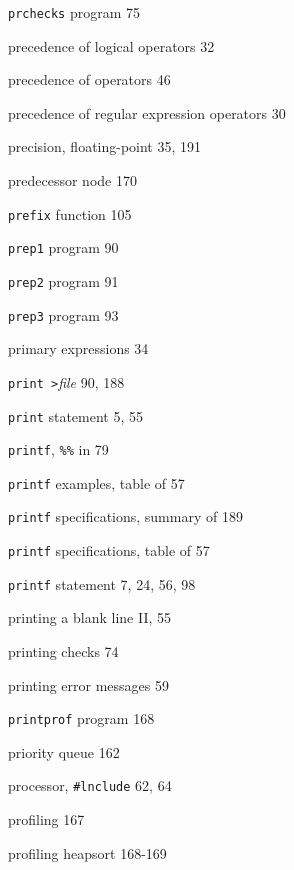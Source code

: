 \begin{multicols}{3}
\hangindent=3pc  \verb'prchecks' program 75

\hangindent=3pc  precedence of logical operators 32

\hangindent=3pc  precedence of operators 46

\hangindent=3pc  precedence of regular expression operators 30

\hangindent=3pc  precision, floating-point 35, 191

\hangindent=3pc  predecessor node 170

\hangindent=3pc  \verb'prefix' function 105

\hangindent=3pc  \verb'prep1' program 90

\hangindent=3pc  \verb'prep2' program 91

\hangindent=3pc  \verb'prep3' program 93

\hangindent=3pc  primary expressions 34

\hangindent=3pc  \verb'print >'\textit{file} 90, 188

\hangindent=3pc  \verb'print' statement 5, 55

\hangindent=3pc  \verb'printf', \verb'%%' in 79

\hangindent=3pc  \verb'printf' examples, table of 57

\hangindent=3pc  \verb'printf' specifications, summary of 189


\hangindent=3pc  \verb'printf' specifications, table of 57


\hangindent=3pc  \verb'printf' statement 7, 24, 56, 98

\hangindent=3pc  printing a blank line II, 55

\hangindent=3pc  printing checks 74

\hangindent=3pc  printing error messages 59

\hangindent=3pc  \verb'printprof' program 168

\hangindent=3pc  priority queue 162

\hangindent=3pc  processor, \verb'#lnclude' 62, 64

\hangindent=3pc  profiling 167

\hangindent=3pc  profiling heapsort 168-169


\end{multicols}
